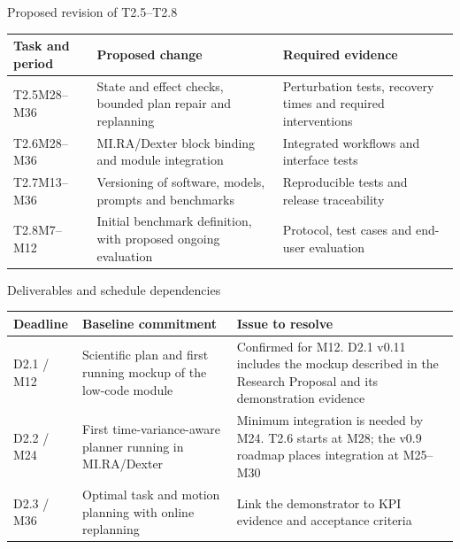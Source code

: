\documentclass[aspectratio=169,10pt]{beamer}
\begin{document}
\begin{frame}{Proposed revision of T2.5--T2.8}
\small\renewcommand{\arraystretch}{1.3}
\begin{tabularx}{\textwidth}{@{}p{}XX@{}}
\toprule
Task and period & Proposed change & Required evidence\\\midrule
T2.5\newline M28--M36 & State and effect checks, bounded plan repair and replanning & Perturbation tests, recovery times and required interventions\\
T2.6\newline M28--M36 & MI.RA/Dexter block binding and module integration & Integrated workflows and interface tests\\
T2.7\newline M13--M36 & Versioning of software, models, prompts and benchmarks & Reproducible tests and release traceability\\
T2.8\newline M7--M12 & Initial benchmark definition, with proposed ongoing evaluation & Protocol, test cases and end-user evaluation\\\bottomrule
\end{tabularx}
\end{frame}

\begin{frame}{Deliverables and schedule dependencies}
\small\renewcommand{\arraystretch}{1.35}
\begin{tabularx}{\textwidth}{@{}p{}XX@{}}
\toprule
Deadline & Baseline commitment & Issue to resolve\\\midrule
D2.1 / M12 & Scientific plan and first running mockup of the low-code module & Confirmed for M12. D2.1 v0.11 includes the mockup described in the Research Proposal and its demonstration evidence\\
D2.2 / M24 & First time-variance-aware planner running in MI.RA/Dexter & Minimum integration is needed by M24. T2.6 starts at M28; the v0.9 roadmap places integration at M25--M30\\
D2.3 / M36 & Optimal task and motion planning with online replanning & Link the demonstrator to KPI evidence and acceptance criteria\\\bottomrule
\end{tabularx}
\end{frame}
\end{document}
